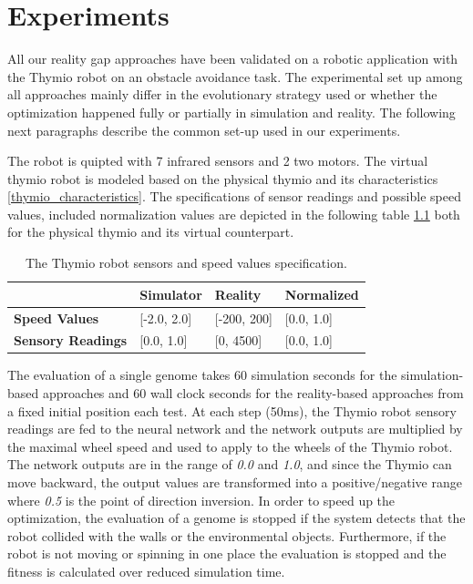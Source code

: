 \chapter{Experiments}

All our reality gap approaches have been validated on a robotic application with the Thymio robot on an obstacle avoidance task. The experimental set up among all approaches mainly differ in the evolutionary strategy used or whether the optimization happened fully or partially in simulation and reality. The following next paragraphs describe the common set-up used in our experiments.

The robot is quipted with 7 infrared sensors and 2 two motors. The virtual thymio robot is modeled based on the physical thymio and its characteristics \ref{thymio_characteristics}. The specifications of sensor readings and possible speed values, included normalization values are depicted in the following table \ref{tab:thymio_specs} both for the physical thymio and its virtual counterpart.

\begin{table}[H]
\centering
\begin{tabular}{llll}
\hline
\textbf{}                            & \textbf{Simulator}    & \textbf{Reality}  & \textbf{Normalized}  \\ \hline
\textbf{Speed Values}                & {[}-2.0, 2.0{]}       & {[}-200, 200{]}      & {[}0.0, 1.0{]} \\
\textbf{Sensory Readings}            & {[}0.0, 1.0{]}        & {[}0, 4500{]}        & {[}0.0, 1.0{]} \\
\end{tabular}
\caption{The Thymio robot sensors and speed values specification.}
\label{tab:thymio_specs}
\end{table}

The evaluation of a single genome takes 60 simulation seconds for the simulation-based approaches and 60 wall clock seconds for the reality-based approaches from a fixed initial position each test. At each step (50ms), the Thymio robot sensory readings are fed to the neural network and the network outputs are multiplied by the maximal wheel speed and used to apply to the wheels of the Thymio robot. The network outputs are in the range of \emph{0.0} and \emph{1.0}, and since the Thymio can move backward, the output values are transformed into a positive/negative range where \emph{0.5} is the point of direction inversion. In order to speed up the optimization, the evaluation of a genome is stopped if the system detects that the robot collided with the walls or the environmental objects. Furthermore, if the robot is not moving or spinning in one place the evaluation is stopped and the fitness is calculated over reduced simulation time.

